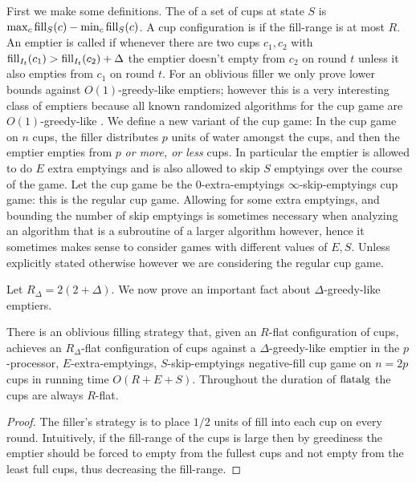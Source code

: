 First we make some definitions. The  of a set of
cups at state $S$ is $\max_c \operatorname{\text{\textup{fill}}}_S(c) - \min_c \operatorname{\text{\textup{fill}}}_S(c)$. A cup
configuration is  if the fill-range is at most
$R$. An emptier is called  if whenever
there are two cups $c_1, c_2$ with $\operatorname{\text{\textup{fill}}}_{I_t}(c_1) >
\operatorname{\text{\textup{fill}}}_{I_t}(c_2) + \Delta$ the emptier doesn't empty from $c_2$ on
round $t$ unless it also empties from $c_1$ on round $t$. For an
oblivious filler we only prove lower bounds against
$O(1)$-greedy-like emptiers; however this is a very interesting
class of emptiers because all known randomized algorithms for the
cup game are $O(1)$-greedy-like \cite{mbe19, wku20}. We define a
new variant of the cup game: In the 
 cup game on $n$ cups, the filler
distributes $p$ units of water amongst the cups, and then the
emptier empties from $p$ \textit{or more, or less} cups. In
particular the emptier is allowed to do $E$ extra emptyings and
is also allowed to skip $S$ emptyings over the course of the
game. Let the  cup game be the $0$-extra-emptyings
$\infty$-skip-emptyings cup game: this is the regular cup game.
Allowing for some extra emptyings, and bounding the number of
skip emptyings is sometimes necessary when analyzing an algorithm
that is a subroutine of a larger algorithm however, hence it
sometimes makes sense to consider games with different values of
$E,S$. Unless explicitly stated otherwise however we are
considering the regular cup game.

Let $R_\Delta = 2(2+\Delta)$.
We now prove an important fact about $\Delta$-greedy-like emptiers.
\begin{lemma}
  \label{lem:TO_flatalg}
  There is an oblivious filling strategy  that,
  given an $R$-flat configuration of cups, achieves an
  $R_\Delta$-flat configuration of cups against a
  $\Delta$-greedy-like emptier in the $p$-processor,
  $E$-extra-emptyings, $S$-skip-emptyings negative-fill cup game
  on $n=2p$ cups in running time $O(R+E+S)$. Throughout the
  duration of $\operatorname{\text{\textup{flatalg}}}$ the cups are always $R$-flat.
\end{lemma}
\begin{proof}
  The filler's strategy is to place $1/2$ units of fill into each
  cup on every round.
  Intuitively, if the fill-range of the cups is large then by
  greediness the emptier should be forced to empty from the
  fullest cups and not empty from the least full cups, thus
  decreasing the fill-range.
\end{proof}

